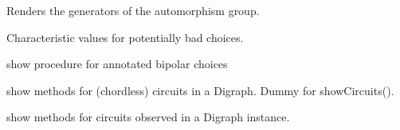 \documentclass[letterpaper,10pt,english]{sphinxmanual}
\begin{document}
\begin{fulllineitems}
\begin{fulllineitems}
\label{techDoc:digraphs.Digraph.showAll}
\end{fulllineitems}


\begin{fulllineitems}
\label{techDoc:digraphs.Digraph.showAutomorphismGenerators}
Renders the generators of the automorphism group.

\end{fulllineitems}


\begin{fulllineitems}
\label{techDoc:digraphs.Digraph.showBadChoices}
Characteristic values for potentially bad choices.

\end{fulllineitems}


\begin{fulllineitems}
\label{techDoc:digraphs.Digraph.showChoiceVector}
show procedure for annotated bipolar choices

\end{fulllineitems}


\begin{fulllineitems}
\label{techDoc:digraphs.Digraph.showChordlessCircuits}
show methods for (chordless) circuits in a Digraph.
Dummy for showCircuits().

\end{fulllineitems}


\begin{fulllineitems}
\label{techDoc:digraphs.Digraph.showCircuits}
show methods for circuits observed in a Digraph instance.

\end{fulllineitems}


\end{fulllineitems}
\end{document}
